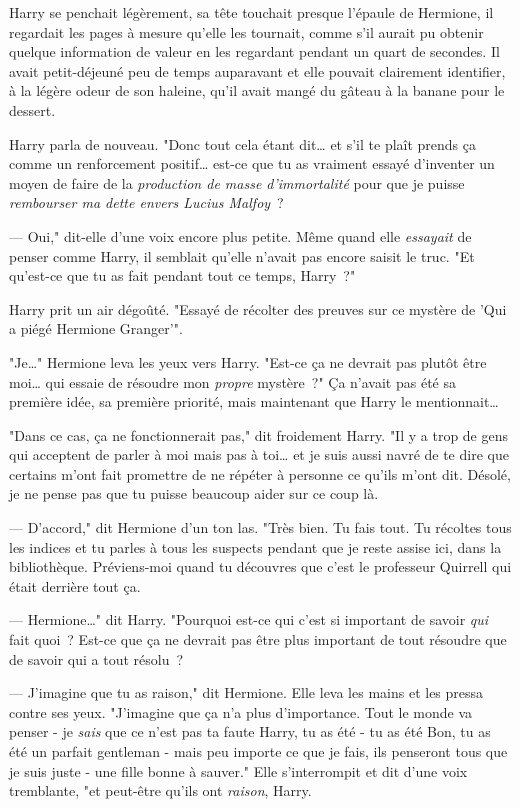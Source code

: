 Harry se penchait légèrement, sa tête touchait presque l'épaule de Hermione, il regardait les pages à mesure qu'elle les tournait, comme s'il aurait pu obtenir quelque information de valeur en les regardant pendant un quart de secondes. Il avait petit-déjeuné peu de temps auparavant et elle pouvait clairement identifier, à la légère odeur de son haleine, qu'il avait mangé du gâteau à la banane pour le dessert.

Harry parla de nouveau. "Donc tout cela étant dit… et s'il te plaît prends ça comme un renforcement positif… est-ce que tu as vraiment essayé d'inventer un moyen de faire de la \emph{production de masse d'immortalité} pour que je puisse \emph{rembourser ma dette envers Lucius Malfoy}~?

--- Oui," dit-elle d'une voix encore plus petite. Même quand elle \emph{essayait} de penser comme Harry, il semblait qu'elle n'avait pas encore saisit le truc. "Et qu'est-ce que tu as fait pendant tout ce temps, Harry~?"

Harry prit un air dégoûté. "Essayé de récolter des preuves sur ce mystère de 'Qui a piégé Hermione Granger'".

"Je…" Hermione leva les yeux vers Harry. "Est-ce ça ne devrait pas plutôt être moi… qui essaie de résoudre mon \emph{propre} mystère~?" Ça n'avait pas été sa première idée, sa première priorité, mais maintenant que Harry le mentionnait…

"Dans ce cas, ça ne fonctionnerait pas," dit froidement Harry. "Il y a trop de gens qui acceptent de parler à moi mais pas à toi… et je suis aussi navré de te dire que certains m'ont fait promettre de ne répéter à personne ce qu'ils m'ont dit. Désolé, je ne pense pas que tu puisse beaucoup aider sur ce coup là.

--- D'accord," dit Hermione d'un ton las. "Très bien. Tu fais tout. Tu récoltes tous les indices et tu parles à tous les suspects pendant que je reste assise ici, dans la bibliothèque. Préviens-moi quand tu découvres que c'est le professeur Quirrell qui était derrière tout ça.

--- Hermione…" dit Harry. "Pourquoi est-ce qui c'est si important de savoir \emph{qui} fait quoi~? Est-ce que ça ne devrait pas être plus important de tout résoudre que de savoir qui a tout résolu~?

--- J'imagine que tu as raison," dit Hermione. Elle leva les mains et les pressa contre ses yeux. "J'imagine que ça n'a plus d'importance. Tout le monde va penser - je \emph{sais} que ce n'est pas ta faute Harry, tu as été - tu as été Bon, tu as été un parfait gentleman - mais peu importe ce que je fais, ils penseront tous que je suis juste - une fille bonne à sauver." Elle s'interrompit et dit d'une voix tremblante, "et peut-être qu'ils ont \emph{raison}, Harry.

